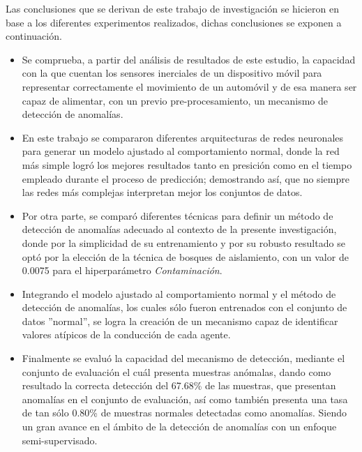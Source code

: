 \vspace{5mm} %

Las conclusiones que se derivan de este trabajo de investigaci\'{o}n se hicieron en base a los diferentes experimentos realizados, dichas conclusiones se exponen a continuaci\'{o}n.

\begin{itemize}
\item Se comprueba, a partir del an\'{a}lisis de resultados de este estudio, la capacidad con la que cuentan los sensores inerciales de un dispositivo m\'{o}vil para representar correctamente el movimiento de un autom\'{o}vil y de esa manera ser capaz de alimentar, con un previo pre-procesamiento, un mecanismo de detecci\'{o}n de anomal\'{i}as.
\item En este trabajo se compararon diferentes arquitecturas de redes neuronales para generar un modelo ajustado al comportamiento normal, donde la red m\'{a}s simple logr\'{o} los mejores resultados tanto en presici\'{o}n como en el tiempo empleado durante el proceso de predicci\'{o}n; demostrando as\'{i}, que no siempre las redes m\'{a}s complejas interpretan mejor los conjuntos de datos.
\item Por otra parte, se compar\'{o} diferentes t\'{e}cnicas para definir un m\'{e}todo de detecci\'{o}n de anomal\'{i}as adecuado al contexto de la presente investigaci\'{o}n, donde por la simplicidad de su entrenamiento y por su robusto resultado se opt\'{o} por la elecci\'{o}n de la t\'{e}cnica de bosques de aislamiento, con un valor de 0.0075 para el hiperpar\'{a}metro \textit{Contaminaci\'{o}n}.
\item Integrando el modelo ajustado al comportamiento normal y el m\'{e}todo de detecci\'{o}n de anomal\'{i}as, los cuales s\'{o}lo fueron entrenados con el conjunto de datos ''normal'', se logra la creaci\'{o}n de un mecanismo capaz de identificar valores at\'{i}picos de la conducci\'{o}n de cada agente.
\item Finalmente se evalu\'{o} la capacidad del mecanismo de detecci\'{o}n, mediante el conjunto de evaluaci\'{o}n el cu\'{a}l presenta muestras an\'{o}malas, dando como resultado la correcta detecci\'{o}n del 67.68\% de las muestras, que presentan anomal\'{i}as en el conjunto de evaluaci\'{o}n, as\'{i} como tambi\'{e}n presenta una tasa de tan s\'{o}lo 0.80\% de muestras normales detectadas como anomal\'{i}as. Siendo un gran avance en el \'{a}mbito de la detecci\'{o}n de anomal\'{i}as con un enfoque semi-supervisado.%
\end{itemize}

